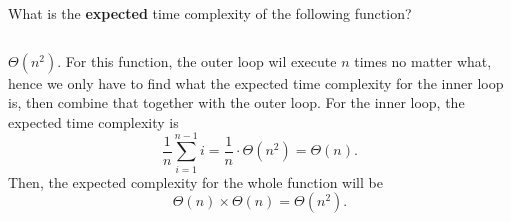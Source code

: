\begin{prob}
    What is the \textbf{expected} time complexity of the following function?

    \inputminted{python}{./code.py}

    \begin{soln}
        $\Theta(n^2)$. For this function, the outer loop wil execute $n$ times no matter what, hence we only have to find what the 
        expected time complexity for the inner loop is, then combine that together with the outer loop. For the inner loop, the expected 
        time complexity is 
        \[ \frac{1}{n} \sum_{i = 1}^{n - 1} i = \frac{1}{n} \cdot \Theta(n^2) = \Theta(n). \]
        Then, the expected complexity for the whole function will be 
        \[ \Theta(n) \times \Theta(n) = \Theta(n^2). \]
    \end{soln}

\end{prob}
